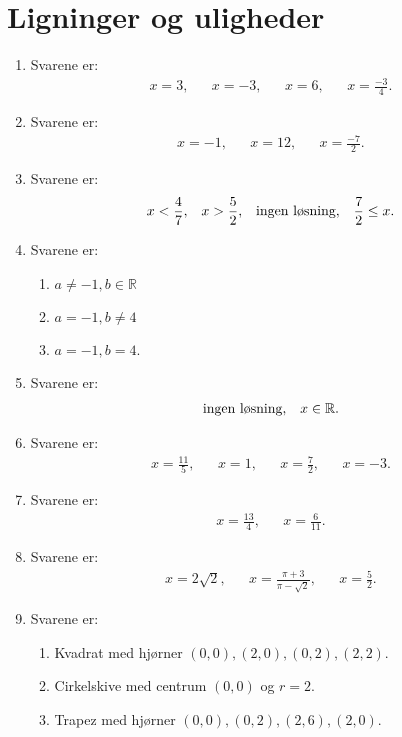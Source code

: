 \section{Ligninger og uligheder}
\begin{enumerate}
\item Svarene er:
\begin{align*}
x=3,&& x=-3,&&x=6,&& x=\frac{-3}{4}.
\end{align*}

\item Svarene er:
\begin{align*}
x=-1,&& x=12,&& x=\frac{-7}{2}.
\end{align*}

\item Svarene er: 
\begin{align*}
x<\frac{4}{7},&& x>\frac{5}{2},&& \textup{ingen løsning},&& \frac{7}{2}\leq x.
\end{align*}

\item Svarene er:
\begin{enumerate}
\item $a\neq -1, b\in \mathbb{R}$
\item $a=-1,b\neq 4$
\item $a=-1,b=4$.
\end{enumerate}

\item Svarene er:
\begin{align*}
 \textup{ingen løsning},&& x\in \mathbb{R}.
\end{align*}

\item Svarene er:
\begin{align*}
x=\frac{11}{5},&& x=1,&& x=\frac{7}{2},&& x=-3.
\end{align*}

\item Svarene er:
\begin{align*}
x=\frac{13}{4},&& x=\frac{6}{11}.
\end{align*}

\item Svarene er:
\begin{align*}
x=2\sqrt{2},&& x=\frac{\pi+3}{\pi-\sqrt{2}},&&x=\frac{5}{2}.
\end{align*}

\item Svarene er:
\begin{enumerate}
	\item Kvadrat med hjørner $(0,0),(2,0),(0,2),(2,2)$.
	\item Cirkelskive med centrum $(0,0)$ og $r=2$.
	\item Trapez med hjørner $(0,0),(0,2),(2,6),(2,0)$.
\end{enumerate}



\end{enumerate}
